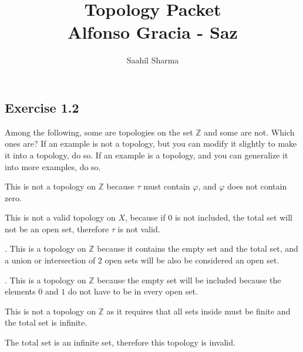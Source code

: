 \documentclass{report}
\title{\Huge{Topology Packet}\\Alfonso Gracia - Saz}
\author{\huge{Saahil Sharma}}
\date{}
\begin{document}
\maketitle
\newpage
{}
\tableofcontents
\pagebreak

\chapter{}
\section{Exercise 1.2}
\begin{center} 
Among the following, some are topologies on the set $\mathbb{Z}$ and some are not. Which ones are? If an example is not a topology, but you can modify it slightly to make it into a topology, do so. If an example is a topology, and you can generalize it into more examples, do so.  
\end{center}
\sol This is not a topology on $\mathbb{Z}$ because $\tau$ must contain $\varphi$, and $\varphi$ does not contain zero.

\sol This is not a valid topology on $X$, because if $0$ is not included, the total set will not be an open set, therefore $\tau$ is not valid.  

.
\sol This is a topology on $\mathbb{Z}$ because it contains the empty set and the total set, and a union or intersection of $2$ open sets will be also be considered an open set. 

.
\sol This is a topology on $\mathbb{Z}$ because the empty set will be included because the elements $0$ and $1$ do not have to be in every open set.

\sol This is not a topology on $\mathbb{Z}$ as it requires that all sets inside must be finite and the total set is infinite.                                                         

\sol The total set is an infinite set, therefore this topology is invalid. 
\end{document}

